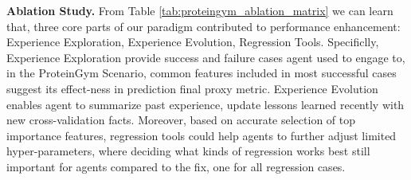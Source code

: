\textbf{Ablation Study.} From Table \ref{tab:proteingym_ablation_matrix} we can learn that, three core parts of our \method{} paradigm contributed to performance enhancement: Experience Exploration, Experience Evolution, Regression Tools. Specificlly, Experience Exploration provide success and failure cases agent used to engage to, in the ProteinGym Scenario, common features included in most successful cases suggest its effect-ness in prediction final proxy metric. Experience Evolution enables agent to summarize past experience, update lessons learned recently with new cross-validation facts. Moreover, based on accurate selection of top importance features, regression tools could help agents to further adjust limited hyper-parameters, where deciding what kinds of regression works best still important for agents compared to the fix, one for all regression cases.








